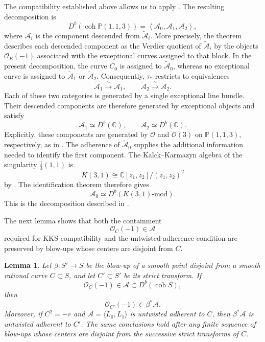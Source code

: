 \documentclass[11pt]{article}
\theoremstyle{plain}
\newtheorem{lemma}[lemma]{Lemma}
\theoremstyle{definition}
\theoremstyle{remark}
\newcommand{\Pp}{\mathbb P}
\newcommand{\C}{\mathbb C}
\newcommand{\Db}{D^b}
\newcommand{\coh}{\operatorname{coh}}
\newcommand{\OO}{\mathcal O}
\begin{document}
The compatibility established above allows us to apply
\cite[Theorem~2.12]{KKS2020}. The resulting decomposition is
\[
\Db(\coh \Pp(1,1,3))
=
\left\langle
\mathcal A_0,\mathcal A_1,\mathcal A_2
\right\rangle,
\]
where \(\mathcal A_i\) is the component descended from
\(\widetilde{\mathcal A}_i\). More precisely, the theorem describes each
descended component as the Verdier quotient of
\(\widetilde{\mathcal A}_i\) by the objects \(\OO_E(-1)\) associated with
the exceptional curves assigned to that block. In the present decomposition,
the curve \(C_0\) is assigned to \(\widetilde{\mathcal A}_0\), whereas no
exceptional curve is assigned to \(\widetilde{\mathcal A}_1\) or
\(\widetilde{\mathcal A}_2\). Consequently, \(\tau_*\) restricts to
equivalences
\[
\widetilde{\mathcal A}_1\xrightarrow{\ \sim\ }\mathcal A_1,
\qquad
\widetilde{\mathcal A}_2\xrightarrow{\ \sim\ }\mathcal A_2.
\]
Each of these two categories is generated by a single exceptional line
bundle. Their descended components are therefore generated by exceptional
objects and satisfy
\[
\mathcal A_1\simeq \Db(\C),
\qquad
\mathcal A_2\simeq \Db(\C).
\]
Explicitly, these components are generated by \(\OO\) and \(\OO(3)\) on
\(\Pp(1,1,3)\), respectively, as in
\cite[Example~3.17]{KKS2020}.
The adherence of \(\widetilde{\mathcal A}_0\) supplies the additional
information needed to identify the first component. The Kalck--Karmazyn
algebra of the singularity \(\frac13(1,1)\) is
\[
K(3,1)\cong \C[z_1,z_2]/(z_1,z_2)^2
\]
by \cite[Example~3.14]{KKS2020}. The identification theorem
\cite[Theorem~3.16]{KKS2020} therefore gives
\[
\mathcal A_0\simeq \Db(K(3,1)\text{-mod}).
\]
This is the decomposition described in \cite[Example~3.17]{KKS2020}.

The next lemma shows that both the containment
\[
\OO_C(-1)\in\mathcal A
\]
required for KKS compatibility and the untwisted-adherence condition are
preserved by blow-ups whose centers are disjoint from \(C\).

\begin{lemma}
\label{lem:kks-blowups}
Let \(\beta:S'\to S\) be the blow-up of a smooth point disjoint from a smooth
rational curve \(C\subset S\), and let \(C'\subset S'\) be its strict
transform. If
\[
\OO_C(-1)\in\mathcal A\subset\Db(\coh S),
\]
then
\[
\OO_{C'}(-1)\in\beta^*\mathcal A.
\]
Moreover, if \(C^2=-r\) and
\(\mathcal A=\langle L_0,L_1\rangle\) is untwisted adherent to \(C\), then
\(\beta^*\mathcal A\) is untwisted adherent to \(C'\). The same conclusions
hold after any finite sequence of blow-ups whose centers are disjoint from
the successive strict transforms of \(C\).
\end{lemma}
\end{document}
